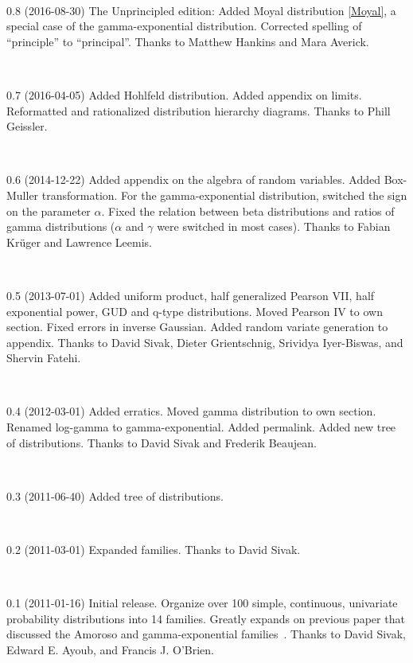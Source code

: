{~

0.8 (2016-08-30)
The Unprincipled edition:
Added Moyal distribution \eqref{Moyal}, a special case of the gamma-exponential distribution.
Corrected spelling of ``principle'' to ``principal''. Thanks to Matthew Hankins and Mara Averick.

~

0.7 (2016-04-05) 
%
Added Hohlfeld distribution. %
Added appendix on limits.
Reformatted and rationalized distribution hierarchy diagrams. 
Thanks to Phill Geissler.

~

0.6 (2014-12-22)
%
Added appendix on the algebra of random variables.
Added Box-Muller transformation.
For the gamma-exponential distribution, switched the sign on the parameter $\alpha$.
Fixed the relation between beta distributions and ratios of gamma distributions ($\alpha$ and $\gamma$ were switched in most cases).
Thanks to Fabian Kr\"uger and Lawrence Leemis.


~


0.5 (2013-07-01)
Added uniform product, half generalized Pearson VII, half exponential power, GUD and q-type distributions. 
Moved Pearson IV to own section.
Fixed errors in inverse Gaussian.
Added random variate generation to appendix.
Thanks to David Sivak, Dieter Grientschnig, Srividya Iyer-Biswas, and Shervin Fatehi.

~

0.4 (2012-03-01) 
Added erratics. 
Moved gamma distribution to own section.
Renamed log-gamma to gamma-exponential.
Added permalink.
Added new tree of distributions. 
Thanks to David Sivak and Frederik Beaujean.

~

0.3 (2011-06-40) 
Added tree of distributions. 

~

0.2 (2011-03-01) 
Expanded families.  
Thanks to David Sivak. 

~

 0.1 (2011-01-16)
 Initial release. Organize over 100  simple, continuous, univariate probability distributions into 14 families. Greatly expands on previous paper that discussed the Amoroso and gamma-exponential families~\cite{_amoroso}. Thanks to David Sivak, Edward E. Ayoub, and Francis J. O'Brien.

}



